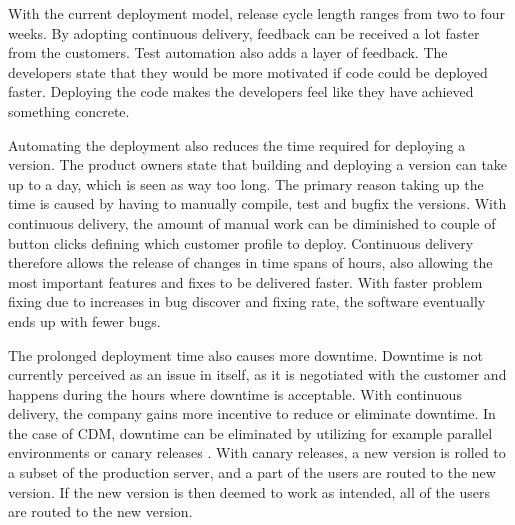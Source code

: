 \documentclass[english]{tktltiki2}
\theoremstyle{definition}
\theoremstyle{remark}
\begin{document}



With the current deployment model, release cycle length ranges from two to four weeks. By adopting continuous delivery, feedback can be received a lot faster from the customers. Test automation also adds a layer of feedback. The developers state that they would be more motivated if code could be deployed faster. Deploying the code makes the developers feel like they have achieved something concrete. %

Automating the deployment also reduces the time required for deploying a version. The product owners state that building and deploying a version can take up to a day, which is seen as way too long. The primary reason taking up the time is caused by having to manually compile, test and bugfix the versions. With continuous delivery, the amount of manual work can be diminished to couple of button clicks defining which customer profile to deploy. Continuous delivery therefore allows the release of changes in time spans of hours, also allowing the most important features and fixes to be delivered faster. With faster problem fixing due to increases in bug discover and fixing rate, the software eventually ends up with fewer bugs. %

The prolonged deployment time also causes more downtime. Downtime is not currently perceived as an issue in itself, as it is negotiated with the customer and happens during the hours where downtime is acceptable. With continuous delivery, the company gains more incentive to reduce or eliminate downtime. In the case of CDM, downtime can be eliminated by utilizing for example parallel environments or canary releases \cite{cdbook}. With canary releases, a new version is rolled to a subset of the production server, and a part of the users are routed to the new version. If the new version is then deemed to work as intended, all of the users are routed to the new version.
\end{document}
